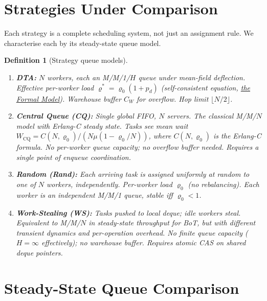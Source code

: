 \documentclass[11pt,a4paper]{report}
\newtheorem{definition}{Definition}[section]
\begin{document}
\section{Strategies Under Comparison}

Each strategy is a complete scheduling system, not just an assignment rule.
We characterise each by its steady-state queue model.

\begin{definition}[Strategy queue models]~
\begin{enumerate}
  \item \textbf{DTA:}
        $N$ workers, each an M/M/1/$H$ queue under mean-field deflection.
        Effective per-worker load $\varrho^* = \varrho_0(1 + p_d)$
        (self-consistent equation, \hyperref[chap:formal_model]{the Formal Model}).
        Warehouse buffer $C_W$ for overflow.  Hop limit $\lfloor N/2 \rfloor$.

  \item \textbf{Central Queue (CQ):}
        Single global FIFO, $N$ servers.  The classical M/M/$N$ model with
        Erlang-C steady state.  Tasks see mean wait
        $W_{\mathrm{CQ}} = C(N,\varrho_0) / (N\mu(1-\varrho_0/N))$,
        where $C(N,\varrho_0)$ is the Erlang-C formula.
        No per-worker queue capacity; no overflow buffer needed.
        \emph{Requires a single point of enqueue coordination.}

  \item \textbf{Random (Rand):}
        Each arriving task is assigned uniformly at random to one of $N$ workers,
        independently.  Per-worker load $\varrho_0$ (no rebalancing).
        Each worker is an independent M/M/1 queue, stable iff $\varrho_0 < 1$.

  \item \textbf{Work-Stealing (WS):}
        Tasks pushed to local deque; idle workers steal.  Equivalent to
        M/M/$N$ in steady-state throughput for BoT, but with different
        transient dynamics and per-operation overhead.  No finite queue capacity
        ($H = \infty$ effectively); no warehouse buffer.
        \emph{Requires atomic CAS on shared deque pointers.}
\end{enumerate}
\end{definition}

\section{Steady-State Queue Comparison}
\end{document}
